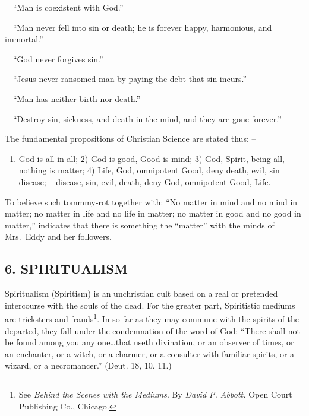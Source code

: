\documentclass[
]{book}
\providecommand{\tightlist}{%
  \setlength{\itemsep}{0pt}\setlength{\parskip}{0pt}}
\begin{document}
~~``Man is coexistent with God.''

~~``Man never fell into sin or death; he is forever happy, harmonious, and immortal.''

~~``God never forgives sin.''

~~``Jesus never ransomed man by paying the debt that sin incurs.''

~~``Man has neither birth nor death.''

~~``Destroy sin, sickness, and death in the mind, and they are gone forever.''

The fundamental propositions of Christian Science are stated thus: --

\begin{enumerate}
\def\labelenumi{\arabic{enumi})}
\tightlist
\item
  God is all in all; 2) God is good, Good is mind; 3) God, Spirit, being all, nothing is matter; 4) Life, God, omnipotent Good, deny death, evil, sin disease; -- disease, sin, evil, death, deny God, omnipotent Good, Life.
\end{enumerate}

To believe such tommmy-rot together with: ``No matter in mind and no mind in matter; no matter in life and no life in matter; no matter in good and no good in matter,'' indicates that there is something the ``matter'' with the minds of Mrs.~Eddy and her followers.

\subsection*{\texorpdfstring{6. SPIRITUALISM}{6. SPIRITUALISM}}\label{spiritualism}

Spiritualism (Spiritism) is an unchristian cult based on a real or pretended intercourse with the souls of the dead. For the greater part, Spiritistic mediums are tricksters and frauds\footnote{See \emph{Behind the Scenes with the Mediums}. By \emph{David P. Abbott.} Open Court Publishing Co., Chicago.}. In so far as they may commune with the spirits of the departed, they fall under the condemnation of the word of God: ``There shall not be found among you any one\ldots that useth divination, or an observer of times, or an enchanter, or a witch, or a charmer, or a consulter with familiar spirits, or a wizard, or a necromancer.'' (Deut. 18, 10. 11.)
\end{document}
